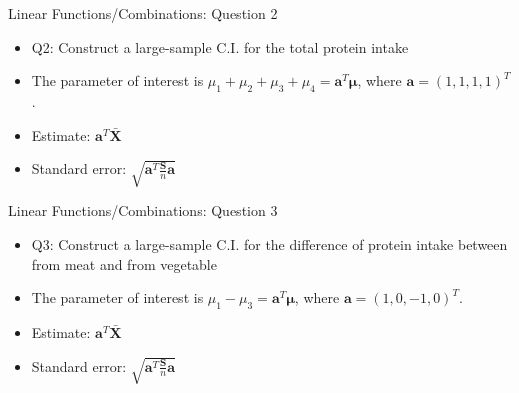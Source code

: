 \documentclass[
  ignorenonframetext,
]{beamer}
\providecommand{\tightlist}{%
  \setlength{\itemsep}{0pt}\setlength{\parskip}{0pt}}
\begin{document}
\begin{frame}{Linear Functions/Combinations: Question 2}
\protect\hypertarget{linear-functionscombinations-question-2}{}
\begin{itemize}
\tightlist
\item
  Q2: Construct a large-sample C.I. for the total protein intake
\item
  The parameter of interest is
  \(\mu_1+\mu_2+\mu_3+\mu_4=\mathbf a^T \boldsymbol \mu\), where
  \(\mathbf a=(1,1,1,1)^T\).
\item
  Estimate: \(\mathbf a^T \bar{\mathbf X}\)
\item
  Standard error: \(\sqrt{\mathbf a^T\frac{\mathbf S}{n} \mathbf a}\)
\end{itemize}
\end{frame}

\begin{frame}{Linear Functions/Combinations: Question 3}
\protect\hypertarget{linear-functionscombinations-question-3}{}
\begin{itemize}
\tightlist
\item
  Q3: Construct a large-sample C.I. for the difference of protein intake
  between from meat and from vegetable
\item
  The parameter of interest is
  \(\mu_1 - \mu_3=\mathbf a^T \boldsymbol \mu\), where
  \(\mathbf a=(1, 0, -1, 0)^T\).
\item
  Estimate: \(\mathbf a^T \bar{\mathbf X}\)
\item
  Standard error: \(\sqrt{\mathbf a^T\frac{\mathbf S}{n} \mathbf a}\)
\end{itemize}
\end{frame}
\end{document}
